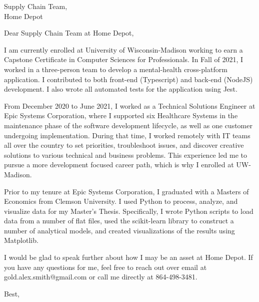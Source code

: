 \documentclass[a4paper, 10pt]{letter}
\begin{document}
	\begin{letter}
	{
	    Supply Chain Team,\\
	    Home Depot
	}

		    \opening{Dear Supply Chain Team at Home Depot,}


		I am currently enrolled at University of Wisconsin-Madison working to earn a Capstone Certificate in Computer Sciences for Professionals. In Fall of 2021, I worked in a three-person team to develop a mental-health cross-platform application. I contributed to both front-end (Typescript) and back-end (NodeJS) development. I also wrote all automated tests for the application using Jest. 

		From December 2020 to June 2021, I worked as a Technical Solutions Engineer at Epic Systems Corporation, where I supported six Healthcare Systems in the maintenance phase of the software development lifecycle, as well as one customer undergoing implementation. During that time, I worked remotely with IT teams all over the country to set priorities, troubleshoot issues, and discover creative solutions to various technical and business problems. This experience led me to pursue a more development focused career path, which is why I enrolled at UW-Madison.

		Prior to my tenure at Epic Systems Corporation, I graduated with a Masters of Economics from Clemson University. I used Python to process, analyze, and visualize data for my Master’s Thesis. Specifically, I wrote Python scripts to load data from a number of flat files, used the scikit-learn library to construct a number of analytical models, and created visualizations of the results using Matplotlib.

		I would be glad to speak further about how I may be an asset at Home Depot. If you have any questions for me, feel free to reach out over email at gold.alex.smith@gmail.com or call me directly at 864-498-3481. 


		    \closing{Best,}

		    \end{letter}
		    
\end{document}
